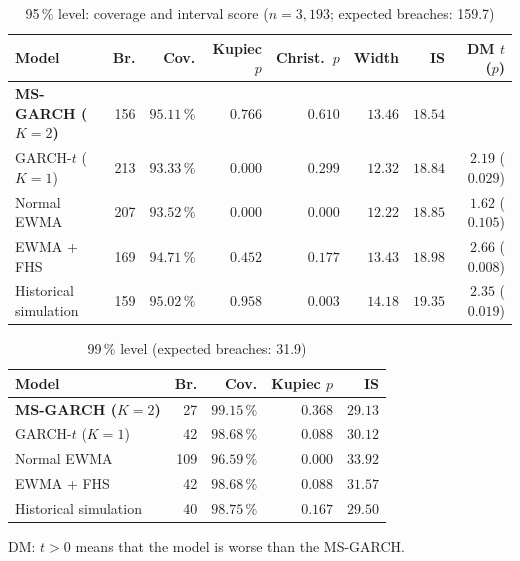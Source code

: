 \documentclass[12pt,a4paper]{article}
\begin{document}
\begin{table}[H]
	\centering
	\small
	\caption{95\,\% level: coverage and interval score ($n=3{,}193$; expected breaches: 159.7)}
	\label{tab:bm-95}
	\setlength{\tabcolsep}{4pt}
	\begin{tabular}{lrrrrrrr}
		\toprule
		Model & Br. & Cov. & Kupiec $p$ & Christ.\ $p$ & Width & IS & DM $t$ ($p$) \\
		\midrule
		\textbf{MS-GARCH ($K=2$)} & 156 & $95.11\,\%$ & $0.766$ & $0.610$ & $13.46$ & $\mathbf{18.54}$ & \\
		GARCH-$t$ ($K=1$) & 213 & $93.33\,\%$ & $\mathbf{0.000}$ & $0.299$ & $12.32$ & $18.84$ & $2.19$ ($0.029$) \\
		Normal EWMA & 207 & $93.52\,\%$ & $\mathbf{0.000}$ & $\mathbf{0.000}$ & $12.22$ & $18.85$ & $1.62$ ($0.105$) \\
		EWMA + FHS & 169 & $94.71\,\%$ & $0.452$ & $0.177$ & $13.43$ & $18.98$ & $2.66$ ($0.008$) \\
		Historical simulation & 159 & $95.02\,\%$ & $0.958$ & $\mathbf{0.003}$ & $14.18$ & $19.35$ & $2.35$ ($0.019$) \\
		\bottomrule
	\end{tabular}
\end{table}

\begin{table}[H]
	\centering
	\small
	\caption{99\,\% level (expected breaches: 31.9)}
	\label{tab:bm-99}
	\begin{tabular}{lrrrr}
		\toprule
		Model & Br. & Cov. & Kupiec $p$ & IS \\
		\midrule
		\textbf{MS-GARCH ($K=2$)} & 27 & $99.15\,\%$ & $0.368$ & $\mathbf{29.13}$ \\
		GARCH-$t$ ($K=1$) & 42 & $98.68\,\%$ & $0.088$ & $30.12$ \\
		Normal EWMA & 109 & $96.59\,\%$ & $\mathbf{0.000}$ & $33.92$ \\
		EWMA + FHS & 42 & $98.68\,\%$ & $0.088$ & $31.57$ \\
		Historical simulation & 40 & $98.75\,\%$ & $0.167$ & $29.50$ \\
		\bottomrule
	\end{tabular}
\end{table}

DM: $t>0$ means that the model is worse than the MS-GARCH.
\end{document}
